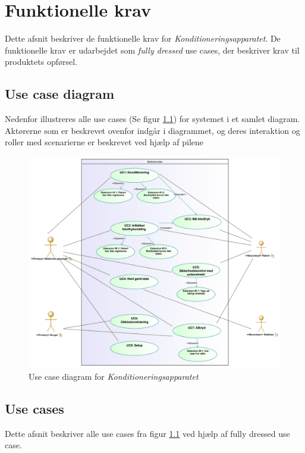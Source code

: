 \chapter{Funktionelle krav}
Dette afsnit beskriver de funktionelle krav for \textit{Konditioneringsapparatet}. De funktionelle krav er udarbejdet som \textit{fully dressed} use cases, der beskriver krav til produktets opførsel.

\section{Use case diagram}
Nedenfor illustreres alle use cases (Se figur \ref{fig:usecasedia}) for systemet i et samlet diagram. Aktørerne som er beskrevet ovenfor indgår i diagrammet, og deres interaktion og roller med scenarierne er beskrevet ved hjælp af pilene
\begin{figure}[H]
	\centering
	\includegraphics[width=\textwidth]{Kravspecifikation/SysML/UCD.png}
	\caption{Use case diagram for \textit{Konditioneringsapparatet}} \label{fig:usecasedia}
\end{figure}



\newpage

\section{Use cases}
Dette afsnit beskriver alle use cases fra figur \ref{fig:usecasedia} ved hjælp af fully dressed use case. 
	
	
	
	
	
	
	
	
	
	
	
	
	
	
	
